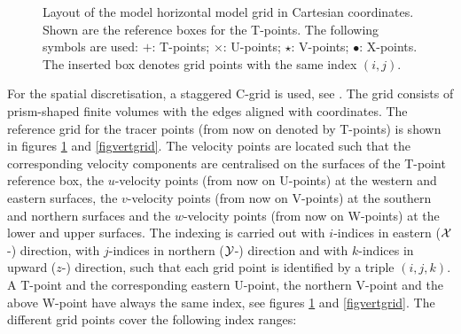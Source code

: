 \begin{figure}
\begin{center}
\caption{Layout of the model horizontal model grid
in Cartesian coordinates. Shown are the
reference boxes for the T-points. The following symbols are used:
$+$: T-points; $\times$: U-points; $\star$: V-points; $\bullet$: X-points.
The inserted box denotes grid points with the same index $(i,j)$.}
\label{fighorgrid}
\end{center}
\end{figure}

For the spatial discretisation, a staggered C-grid is used, see 
\cite{ARAKAWAea77}.  
The grid consists of prism-shaped finite volumes with the
edges aligned with coordinates. The reference grid for the tracer
points (from now on denoted by T-points) is shown in figures 
\ref{fighorgrid} and \ref{figvertgrid}. The velocity points are located such
that the corresponding velocity components are centralised on the 
surfaces of the T-point reference box, the $u$-velocity points (from now on
U-points) at the western and eastern surfaces, the $v$-velocity
points (from now on V-points) at the southern and northern surfaces and the  
$w$-velocity
points (from now on W-points) at the lower and upper surfaces.
The indexing is carried out with $i$-indices\label{indexi} 
in eastern (${\cal X}$-) 
direction, 
with $j$-indices\label{indexj} 
in northern (${\cal Y}$-) direction and with $k$-indices
in upward ($z$-) direction, such that each grid point is identified
by a triple $(i,j,k)$. A T-point and the corresponding eastern U-point,
the northern V-point and the above W-point have always the same index,
see figures \ref{fighorgrid} and \ref{figvertgrid}.
The different grid points cover the following index ranges:

